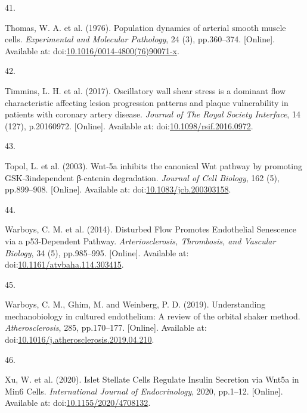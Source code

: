\documentclass[
  11pt,
]{article}
\newlength{\cslhangindent}
\newlength{\csllabelwidth}
\newlength{\cslentryspacingunit} %
\newenvironment{CSLReferences}[2] %
 {%
  \setlength{\parindent}{0pt}
  \ifodd #1
  \let\oldpar\par
  \def\par{\hangindent=\cslhangindent\oldpar}
  \fi
  \setlength{\parskip}{#2\cslentryspacingunit}
 }%
 {}
\newcommand{\CSLLeftMargin}[1]{\parbox[t]{\csllabelwidth}{#1}}
\newcommand{\CSLRightInline}[1]{\parbox[t]{\linewidth - \csllabelwidth}{#1}\break}
\begin{document}
\begin{CSLReferences}{0}{0}
\leavevmode{}%
\CSLLeftMargin{41. }
\CSLRightInline{Thomas, W. A. {et al.} (1976). {Population dynamics of arterial smooth muscle cells}. \emph{Experimental and Molecular Pathology}, 24 (3), pp.360--374. {[}Online{]}. Available at: doi:\href{https://doi.org/10.1016/0014-4800(76)90071-x}{10.1016/0014-4800(76)90071-x}.}

\leavevmode{}%
\CSLLeftMargin{42. }
\CSLRightInline{Timmins, L. H. {et al.} (2017). {Oscillatory wall shear stress is a dominant flow characteristic affecting lesion progression patterns and plaque vulnerability in patients with coronary artery disease}. \emph{Journal of The Royal Society Interface}, 14 (127), p.20160972. {[}Online{]}. Available at: doi:\href{https://doi.org/10.1098/rsif.2016.0972}{10.1098/rsif.2016.0972}.}

\leavevmode{}%
\CSLLeftMargin{43. }
\CSLRightInline{Topol, L. {et al.} (2003). {Wnt-5a inhibits the canonical Wnt pathway by promoting GSK-3{\textendash}independent β-catenin degradation}. \emph{Journal of Cell Biology}, 162 (5), pp.899--908. {[}Online{]}. Available at: doi:\href{https://doi.org/10.1083/jcb.200303158}{10.1083/jcb.200303158}.}

\leavevmode{}%
\CSLLeftMargin{44. }
\CSLRightInline{Warboys, C. M. {et al.} (2014). {Disturbed Flow Promotes Endothelial Senescence via a p53-Dependent Pathway}. \emph{Arteriosclerosis, Thrombosis, and Vascular Biology}, 34 (5), pp.985--995. {[}Online{]}. Available at: doi:\href{https://doi.org/10.1161/atvbaha.114.303415}{10.1161/atvbaha.114.303415}.}

\leavevmode{}%
\CSLLeftMargin{45. }
\CSLRightInline{Warboys, C. M., Ghim, M. and Weinberg, P. D. (2019). {Understanding mechanobiology in cultured endothelium: A review of the orbital shaker method}. \emph{Atherosclerosis}, 285, pp.170--177. {[}Online{]}. Available at: doi:\href{https://doi.org/10.1016/j.atherosclerosis.2019.04.210}{10.1016/j.atherosclerosis.2019.04.210}.}

\leavevmode{}%
\CSLLeftMargin{46. }
\CSLRightInline{Xu, W. {et al.} (2020). {Islet Stellate Cells Regulate Insulin Secretion via Wnt5a in Min6 Cells}. \emph{International Journal of Endocrinology}, 2020, pp.1--12. {[}Online{]}. Available at: doi:\href{https://doi.org/10.1155/2020/4708132}{10.1155/2020/4708132}.}


\end{CSLReferences}
\end{document}
